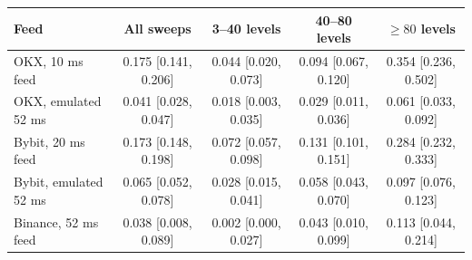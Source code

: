 \begin{tabular}{lcccc}
\toprule
Feed & All sweeps & 3--40 levels & 40--80 levels & $\geq 80$ levels \\
\midrule
OKX, 10 ms feed & 0.175 {\scriptsize[0.141, 0.206]} & 0.044 {\scriptsize[0.020, 0.073]} & 0.094 {\scriptsize[0.067, 0.120]} & 0.354 {\scriptsize[0.236, 0.502]} \\
OKX, emulated 52 ms & 0.041 {\scriptsize[0.028, 0.047]} & 0.018 {\scriptsize[0.003, 0.035]} & 0.029 {\scriptsize[0.011, 0.036]} & 0.061 {\scriptsize[0.033, 0.092]} \\
Bybit, 20 ms feed & 0.173 {\scriptsize[0.148, 0.198]} & 0.072 {\scriptsize[0.057, 0.098]} & 0.131 {\scriptsize[0.101, 0.151]} & 0.284 {\scriptsize[0.232, 0.333]} \\
Bybit, emulated 52 ms & 0.065 {\scriptsize[0.052, 0.078]} & 0.028 {\scriptsize[0.015, 0.041]} & 0.058 {\scriptsize[0.043, 0.070]} & 0.097 {\scriptsize[0.076, 0.123]} \\
Binance, 52 ms feed & 0.038 {\scriptsize[0.008, 0.089]} & 0.002 {\scriptsize[0.000, 0.027]} & 0.043 {\scriptsize[0.010, 0.099]} & 0.113 {\scriptsize[0.044, 0.214]} \\
\bottomrule
\end{tabular}
